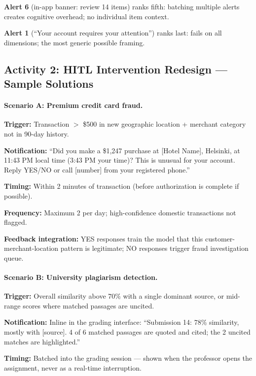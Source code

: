 \textbf{Alert 6} (in-app banner: review 14 items) ranks fifth: batching multiple alerts creates cognitive overhead; no individual item context.

\textbf{Alert 1} (``Your account requires your attention'') ranks last: fails on all dimensions; the most generic possible framing.

\subsection{Activity 2: HITL Intervention Redesign --- Sample Solutions}

\paragraph{Scenario A: Premium credit card fraud.}

\textbf{Trigger:} Transaction $>$ \$500 in new geographic location + merchant category not in 90-day history.

\textbf{Notification:} ``Did you make a \$1,247 purchase at [Hotel Name], Helsinki, at 11:43 PM local time (3:43 PM your time)? This is unusual for your account. Reply YES/NO or call [number] from your registered phone.''

\textbf{Timing:} Within 2 minutes of transaction (before authorization is complete if possible).

\textbf{Frequency:} Maximum 2 per day; high-confidence domestic transactions not flagged.

\textbf{Feedback integration:} YES responses train the model that this customer-merchant-location pattern is legitimate; NO responses trigger fraud investigation queue.

\paragraph{Scenario B: University plagiarism detection.}

\textbf{Trigger:} Overall similarity above 70\% with a single dominant source, or mid-range scores where matched passages are uncited.

\textbf{Notification:} Inline in the grading interface: ``Submission 14: 78\% similarity, mostly with [source]. 4 of 6 matched passages are quoted and cited; the 2 uncited matches are highlighted.''

\textbf{Timing:} Batched into the grading session --- shown when the professor opens the assignment, never as a real-time interruption.

